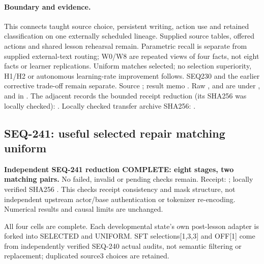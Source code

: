 \documentclass[11pt]{article}
\begin{document}
\paragraph{Boundary and evidence.}
This connects taught source choice, persistent writing, action use and retained
classification on one externally scheduled lineage. Supplied source tables,
offered actions and shared lesson rehearsal remain. Parametric recall is
separate from supplied external-text routing; W0/W8 are repeated views of four
facts, not eight facts or learner replications. Uniform matches selected;
no selection superiority, H1/H2 or autonomous learning-rate improvement follows.
SEQ230 and the earlier corrective trade-off remain separate.
Source ; result memo
.
Raw ,  and 
are under ,  and  in
.
The adjacent  records the
bounded receipt reduction (its SHA256 was locally checked):
.
Locally checked transfer archive SHA256:
.

\subsection{SEQ-241: useful selected repair matching uniform}
\label{sec:selected-reader-repair}

\textbf{Independent SEQ-241 reduction COMPLETE: eight stages, two matching pairs.}
No failed, invalid or pending checks remain. Receipt:
; locally verified SHA256
.
This checks receipt consistency and mask structure, not independent upstream
actor/base authentication or tokenizer re-encoding. Numerical results and
causal limits are unchanged.

All four cells are complete. Each developmental state's own post-lesson adapter
is forked into SELECTED and UNIFORM. SFT selections[1,3,3] and OFF[1] come from
independently verified SEQ-240 actual audits, not semantic filtering or
replacement; duplicated source3 choices are retained.
\end{document}
